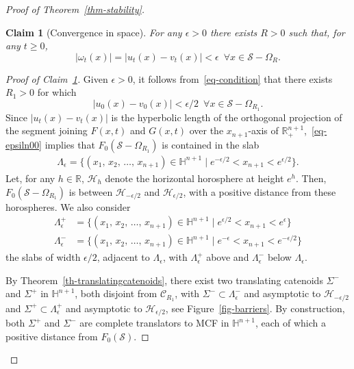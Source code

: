 \documentclass{amsart}[12pt]
\newcommand{\hn}[1]{\h^{#1}}
\renewcommand{\S}{\Sigma}
\newcommand{\cS}{\mathcal{S}}
\newtheorem{claim}[theorem]{Claim}
\theoremstyle{definition}
\theoremstyle{plain}
\newcommand{\R}{\mathbb{R} }
\newcommand{\h}{\mathbb{H} }
\newcommand{\abs}[1]{\vert #1\vert}
\renewcommand{\Lambda}{\varLambda}
\renewcommand{\Omega}{\varOmega}
\renewcommand{\Sigma}{\varSigma}
\begin{document}
\begin{proof}[Proof of Theorem~\ref{thm-stability}]
\begin{claim}[Convergence in space]\label{cl:convergenceinspace}
For any $\epsilon >0$ there exists $R>0$ such that, for any $t\geq 0$,
\begin{equation} \label{eq-epsilon02}
\abs{\omega_t(x)} =|u_t(x)-v_t(x)|<\epsilon
\,\,\, \forall x\in\mathcal S-\Omega_{R}.
\end{equation}
\end{claim}
\begin{proof}[Proof of Claim~\ref{cl:convergenceinspace}]
Given $\epsilon >0$,
it follows from~\eqref{eq-condition} that there exists
$R_1>0$ for which
\begin{equation} \label{eq-epsiln00}
|u_0(x)-v_0(x)|<\epsilon/2 \,\,\, \forall x\in\mathcal S-\Omega_{R_1}.
\end{equation}
Since
$\abs{u_t(x)-v_t(x)}$ is the hyperbolic length of the
orthogonal projection of the segment joining $F(x,t)$ and $G(x,t)$
over the $x_{n+1}$-axis of $\R^{n+1}_+$,~\eqref{eq-epsiln00}
implies that $F_0(\mathcal S-\Omega_{R_1})$
is contained in the slab
\begin{align*}
\Lambda_\epsilon = \{(x_1,\,x_2,\,\ldots,\,x_{n+1})\in \hn{n+1}\mid
e^{-\epsilon/2}<x_{n+1}<e^{\epsilon/2}\}.
\end{align*}
Let, for any $h\in \R$,
$\mathscr H_h$ denote the horizontal horosphere at height $e^h$.
Then, $F_0(\cS-\Omega_{R_1})$ is between $\mathscr H_{-\epsilon/2}$ and
$\mathscr H_{\epsilon/2}$,
with a positive distance from these horospheres.
We also consider
\begin{align*}
\Lambda_\epsilon^+ &= \{(x_1,\,x_2,\,\ldots,\,x_{n+1})\in \hn{n+1}\mid
e^{\epsilon/2}<x_{n+1}<e^{\epsilon}\}\\
\Lambda_\epsilon^- &= \{(x_1,\,x_2,\,\ldots,\,x_{n+1})\in \hn{n+1}\mid
e^{-\epsilon}<x_{n+1}<e^{-\epsilon/2}\}
\end{align*}
the slabs of width $\epsilon/2$, adjacent to $\Lambda_\epsilon$, with
$\Lambda_\epsilon^+$ above and $\Lambda_\epsilon^-$ below
$\Lambda_\epsilon$.

By Theorem~\ref{th-translatingcatenoids}, there
exist two translating catenoids $\Sigma^-$ and $\Sigma^+$ in $\h^{n+1}$,
both disjoint from $\mathscr C_{R_1}$, with
$\Sigma^-\subset \Lambda^-_\epsilon$ and asymptotic
to $\mathscr H_{-\epsilon/2}$ and $\Sigma^+\subset\Lambda_\epsilon^+$ and
asymptotic to
$\mathscr H_{\epsilon/2}$, see Figure~\ref{fig-barriers}.
By construction, both $\S^+$ and $\S^-$
are complete translators to MCF in $\hn{n+1}$, each of which
a positive distance from $F_0(\mathcal S)$.


\end{proof}
\end{proof}
\end{document}
